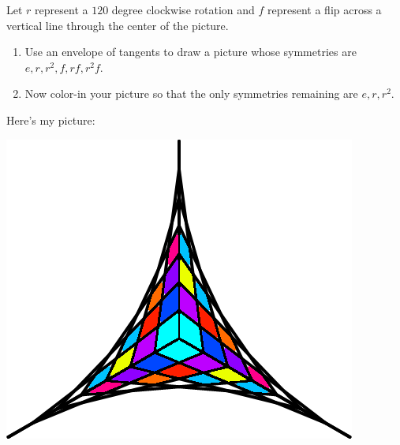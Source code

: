 \documentclass[noauthor,nooutcomes,hints]{ximera}
\begin{document}
\begin{question}
  Let $r$ represent a $120$ degree clockwise rotation and $f$
  represent a flip across a vertical line through the center of the
  picture.  
 \begin{enumerate}
 \item Use an envelope of tangents to draw a picture whose symmetries
   are $e,r,r^2,f,rf,r^2f$.
 \item Now color-in your picture so that the only symmetries remaining
   are $e,r,r^2$.
 \end{enumerate}
 \begin{freeResponse}
   Here's my picture:
   \begin{center}
     \includegraphics[width=.6\textwidth]{ansR3.png}
   \end{center}
 \end{freeResponse}
\end{question}
\mynewpage
\end{document}
